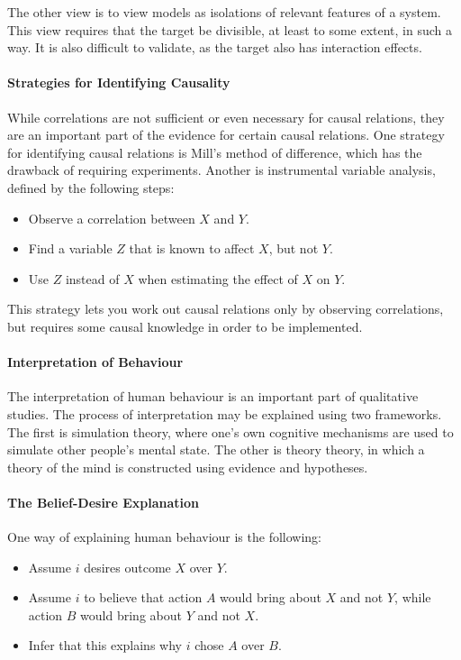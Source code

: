 The other view is to view models as isolations of relevant features of a system. This view requires that the target be divisible, at least to some extent, in such a way. It is also difficult to validate, as the target also has interaction effects.

\paragraph{Strategies for Identifying Causality}
While correlations are not sufficient or even necessary for causal relations, they are an important part of the evidence for certain causal relations. One strategy for identifying causal relations is Mill's method of difference, which has the drawback of requiring experiments. Another is instrumental variable analysis, defined by the following steps:
\begin{itemize}
	\item Observe a correlation between $X$ and $Y$.
	\item Find a variable $Z$ that is known to affect $X$, but not $Y$.
	\item Use $Z$ instead of $X$ when estimating the effect of $X$ on $Y$.
\end{itemize}
This strategy lets you work out causal relations only by observing correlations, but requires some causal knowledge in order to be implemented.

\paragraph{Interpretation of Behaviour}
The interpretation of human behaviour is an important part of qualitative studies. The process of interpretation may be explained using two frameworks. The first is simulation theory, where one's own cognitive mechanisms are used to simulate other people's mental state. The other is theory theory, in which a theory of the mind is constructed using evidence and hypotheses.

\paragraph{The Belief-Desire Explanation}
One way of explaining human behaviour is the following:
\begin{itemize}
	\item Assume $i$ desires outcome $X$ over $Y$.
	\item Assume $i$ to believe that action $A$ would bring about $X$ and not $Y$, while action $B$ would bring about $Y$ and not $X$.
	\item Infer that this explains why $i$ chose $A$ over $B$.
\end{itemize}

